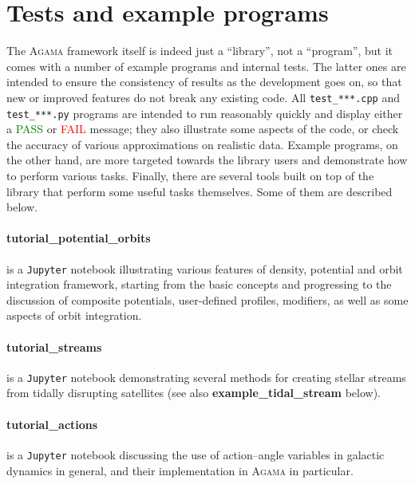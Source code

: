 \documentclass[12pt]{article}
\newcommand{\Agama}{\textsc{Agama}\xspace}
\let\oldparagraph\paragraph
\renewcommand{\paragraph}[1]{\vspace{-2mm}\oldparagraph{#1}}
\begin{document}
\section{Tests and example programs}  \label{sec:ExamplesTests}

The \Agama framework itself is indeed just a ``library'', not a ``program'', but it comes with a number of example programs and internal tests. The latter ones are intended to ensure the consistency of results as the development goes on, so that new or improved features do not break any existing code. All \texttt{test_***.cpp} and \texttt{test_***.py} programs are intended to run reasonably quickly and display either a \textcolor{Green}{PASS} or \textcolor{Red}{FAIL} message; they also illustrate some aspects of the code, or check the accuracy of various approximations on realistic data. Example programs, on the other hand, are more targeted towards the library users and demonstrate how to perform various tasks. Finally, there are several tools built on top of the library that perform some useful tasks themselves. Some of them are described below.

\paragraph{tutorial_potential_orbits} is a \texttt{Jupyter} notebook illustrating various features of density, potential and orbit integration framework, starting from the basic concepts and progressing to the discussion of composite potentials, user-defined profiles, modifiers, as well as some aspects of orbit integration.


\paragraph{tutorial_streams} is a \texttt{Jupyter} notebook demonstrating several methods for creating stellar streams from tidally disrupting satellites (see also \textbf{example_tidal_stream} below).

\paragraph{tutorial_actions} is a \texttt{Jupyter} notebook discussing the use of action--angle variables in galactic dynamics in general, and their implementation in \Agama in particular.
\end{document}
